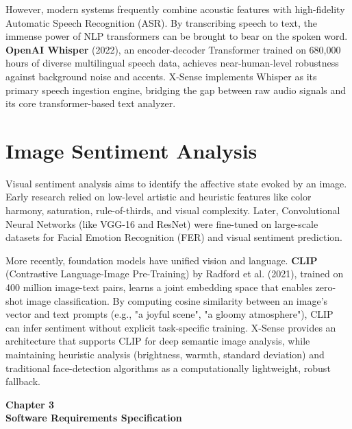 \documentclass[12pt, a4paper]{report}
\begin{document}
However, modern systems frequently combine acoustic features with high-fidelity Automatic Speech Recognition (ASR). By transcribing speech to text, the immense power of NLP transformers can be brought to bear on the spoken word. \textbf{OpenAI Whisper} (2022), an encoder-decoder Transformer trained on 680,000 hours of diverse multilingual speech data, achieves near-human-level robustness against background noise and accents. X-Sense implements Whisper as its primary speech ingestion engine, bridging the gap between raw audio signals and its core transformer-based text analyzer.

\section{Image Sentiment Analysis}

Visual sentiment analysis aims to identify the affective state evoked by an image. Early research relied on low-level artistic and heuristic features like color harmony, saturation, rule-of-thirds, and visual complexity. Later, Convolutional Neural Networks (like VGG-16 and ResNet) were fine-tuned on large-scale datasets for Facial Emotion Recognition (FER) and visual sentiment prediction.

More recently, foundation models have unified vision and language. \textbf{CLIP} (Contrastive Language-Image Pre-Training) by Radford et al. (2021), trained on 400 million image-text pairs, learns a joint embedding space that enables zero-shot image classification. By computing cosine similarity between an image's vector and text prompts (e.g., "a joyful scene", "a gloomy atmosphere"), CLIP can infer sentiment without explicit task-specific training. X-Sense provides an architecture that supports CLIP for deep semantic image analysis, while maintaining heuristic analysis (brightness, warmth, standard deviation) and traditional face-detection algorithms as a computationally lightweight, robust fallback.
\newpage
\thispagestyle{empty}

\vspace*{\fill}
\begin{center}
{\Huge \textbf{Chapter 3}}\\[1cm]
{\Huge \textbf{Software Requirements Specification}}
\end{center}
\vspace*{\fill}

\newpage
\end{document}

